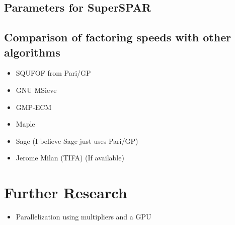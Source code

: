 \documentclass[11pt, letterpaper]{article}
\theoremstyle{definition}
\begin{document}
\subsection{Parameters for SuperSPAR}

\subsection{Comparison of factoring speeds with other algorithms}
\begin{itemize}
\item SQUFOF from Pari/GP
\item GNU MSieve
\item GMP-ECM
\item Maple
\item Sage (I believe Sage just uses Pari/GP)
\item Jerome Milan (TIFA) (If available)
\end{itemize}


\bigbreak
\section{Further Research}
\begin{itemize}
\item Parallelization using multipliers and a GPU
\end{itemize}
\end{document}

